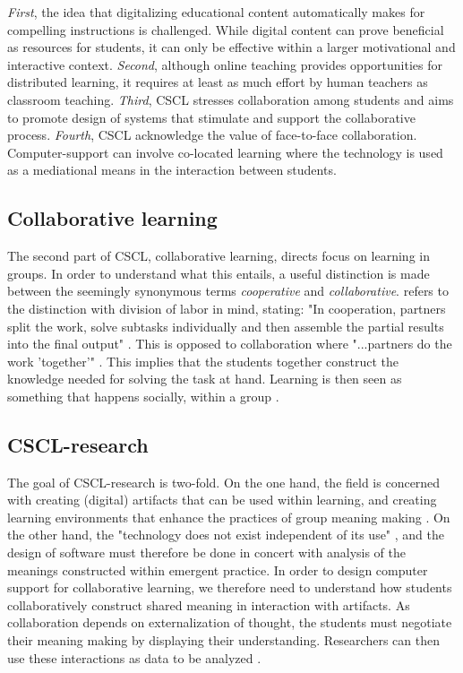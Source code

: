 \emph{First}, the idea that digitalizing educational content automatically makes for compelling instructions is challenged. While digital content can prove beneficial as resources for students, it can only be effective within a larger motivational and interactive context. \emph{Second}, although online teaching provides opportunities for distributed learning, it requires at least as much effort by human teachers as classroom teaching. \emph{Third}, CSCL stresses collaboration among students and aims to promote design of systems that stimulate and support the collaborative process. \emph{Fourth}, CSCL acknowledge the value of face-to-face collaboration. Computer-support can involve co-located learning where the technology is used as a mediational means in the interaction between students.

\subsection{Collaborative learning}
The second part of CSCL, collaborative learning, directs focus on learning in groups. In order to understand what this entails, a useful distinction is made between the seemingly synonymous terms \emph{cooperative} and \emph{collaborative}. \citet*{dillenbourg1999you} refers to the distinction with division of labor in mind, stating: "In cooperation, partners split the work, solve subtasks individually and then assemble the partial results into the final output" \citep[p. 8]{dillenbourg1999you}. This is opposed to collaboration where "...partners do the work 'together'" \citep{dillenbourg1999you}. This implies that the students together construct the knowledge needed for solving the task at hand. Learning is then seen as something that happens socially, within a group \citep{stahl2006computer}. 

\subsection{CSCL-research}
The goal of CSCL-research is two-fold. On the one hand, the field is concerned with creating (digital) artifacts that can be used within learning, and creating learning environments that enhance the practices of group meaning making \citep{stahl2006computer}. On the other hand, the "technology does not exist independent of its use" \citep[\citealp{LeBaron2002} referenced in][]{stahl2006computer}, and the design of software must therefore be done in concert with analysis of the meanings constructed within emergent practice. In order to design computer support for collaborative learning, we therefore need to understand how students collaboratively construct shared meaning in interaction with artifacts. As collaboration depends on externalization of thought, the students must negotiate their meaning making by displaying their understanding. Researchers can then use these interactions as data to be analyzed \citep{stahl2006computer}.

